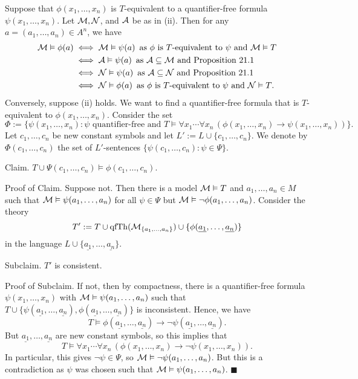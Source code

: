 \documentclass[10pt]{article}
\makeatletter
\DeclareMathOperator{\qfTh}{qfTh}
\theoremstyle{newstyle}
\newenvironment{pf}[1][\proofname]{\par
  \pushQED{\qed}%
  \normalfont \topsep0\p@\relax
  \trivlist
  \item[\hskip\labelsep\scshape
  #1\@addpunct{.}]\ignorespaces
}{%
  \popQED\endtrivlist\@endpefalse
}
\makeatother
\begin{document}
\begin{pf}
Suppose that $\phi(x_1, \dots, x_n)$ is $T$-equivalent to a quantifier-free formula 
$\psi(x_1, \dots, x_n)$. Let ${\cal M}, {\cal N}$, and ${\cal A}$ be as in (ii). 
Then for any $a = (a_1, \dots, a_n) \in A^n$, we have 
\begin{align*}
    {\cal M} \vDash \phi(a) &\iff {\cal M} \vDash \psi(a) \, \text{ as 
    $\phi$ is $T$-equivalent to $\psi$ and ${\cal M} \vDash T$} \\
    &\iff {\cal A} \vDash \psi(a) \, \text{ as ${\cal A} \subseteq {\cal M}$ and Proposition 21.1} \\
    &\iff {\cal N} \vDash \psi(a) \, \text{ as ${\cal A} \subseteq {\cal N}$ and Proposition 21.1} \\
    &\iff {\cal N} \vDash \phi(a) \, \text{ as $\phi$ is $T$-equivalent to $\psi$ and ${\cal N} \vDash T$.}
\end{align*}
Conversely, suppose (ii) holds. We want to find a quantifier-free formula that is $T$-equivalent to 
$\phi(x_1, \dots, x_n)$. Consider the set 
\[ \Phi := \{\psi(x_1, \dots, x_n) : \psi \text{ quantifier-free and }
T \vDash \forall x_1 \cdots \forall x_n \, (\phi(x_1, \dots, x_n) \to \psi(x_1, \dots, x_n))\}. \]
Let $c_1, \dots, c_n$ be new constant symbols and let $L' := L \cup \{c_1, \dots, c_n\}$. 
We denote by $\Phi(c_1, \dots, c_n)$ the set of $L'$-sentences $\{\psi(c_1, \dots, c_n) : 
\psi \in \Psi\}$. 

{\sc Claim.} $T \cup \Psi(c_1, \dots, c_n) \vDash \phi(c_1, \dots, c_n)$. 

{\sc Proof of Claim.} Suppose not. Then there is a model ${\cal M} \vDash T$ and $a_1, \dots, a_n 
\in M$ such that ${\cal M} \vDash \psi(a_1, \dots, a_n)$ for all $\psi \in \Psi$ but 
${\cal M} \vDash \neg \phi(a_1, \dots, a_n)$. Consider the theory 
\[ T' := T \cup \qfTh({\cal M}_{\{a_1, \dots, a_n\}}) \cup \{\phi(\underline{a_1}, 
\dots, \underline{a_n})\} \] 
in the language $L \cup \{\underline{a_1}, \dots, \underline{a_n}\}$. 

{\sc Subclaim.} $T'$ is consistent. 

{\sc Proof of Subclaim.} If not, then by compactness, there is a quantifier-free formula
$\psi(x_1, \dots, x_n)$ with ${\cal M} \vDash \psi(a_1, \dots, a_n)$ such that 
$T \cup \{\psi(\underline{a_1}, \dots, \underline{a_n}), \phi(\underline{a_1}, 
\dots, \underline{a_n})\}$
is inconsistent. Hence, we have 
\[ T \vDash \phi(\underline{a_1}, \dots, \underline{a_n}) \to 
\neg \psi(\underline{a_1}, \dots, \underline{a_n}). \]
But $\underline{a_1}, \dots, \underline{a_n}$ are new constant symbols, so this implies that 
\[ T \vDash \forall x_1 \cdots \forall x_n \, (\phi(x_1, \dots, x_n) \to \neg 
\psi(x_1, \dots, x_n)). \] 
In particular, this gives $\neg \psi \in \Psi$, so ${\cal M} \vDash \neg \psi(a_1, \dots, a_n)$. 
But this is a contradiction as $\psi$ was chosen such that ${\cal M} \vDash 
\psi(a_1, \dots, a_n)$. \hfill $\blacksquare$


\end{pf}
\end{document}
